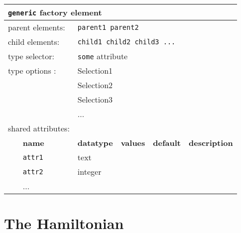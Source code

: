 \begin{table}[h]
\begin{center}
\begin{tabularx}{\textwidth}{l l l l l l }
\hline
\multicolumn{6}{l}{\texttt{generic} factory element} \\
\hline
\multicolumn{2}{l}{parent elements:} & \multicolumn{4}{l}{\texttt{parent1 parent2}}\\
\multicolumn{2}{l}{child  elements:} & \multicolumn{4}{l}{\texttt{child1 child2 child3 ...}}\\
\multicolumn{2}{l}{type   selector:} & \multicolumn{4}{l}{\texttt{some} attribute}\\
\multicolumn{2}{l}{type   options :} & \multicolumn{4}{l}{Selection1}\\
\multicolumn{2}{l}{                } & \multicolumn{4}{l}{Selection2}\\
\multicolumn{2}{l}{                } & \multicolumn{4}{l}{Selection3}\\
\multicolumn{2}{l}{                } & \multicolumn{4}{l}{...}\\
\multicolumn{2}{l}{shared attributes:} & \multicolumn{4}{l}{}\\
   &   \bfseries name     & \bfseries datatype & \bfseries values & \bfseries default   & \bfseries description \\
   &   \texttt{attr1}     &  text              &                  &                     &                       \\
   &   \texttt{attr2}     &  integer           &                  &                     &                       \\
   &   ...                &                    &                  &                     &                       \\
  \hline
\end{tabularx}
\end{center}
\end{table}




\section{The Hamiltonian}


